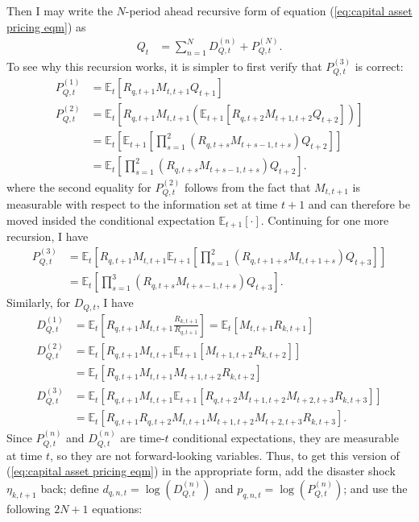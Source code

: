 \documentclass[12 pt, oneside]{article}
\theoremstyle{definition}
\theoremstyle{definition}
\theoremstyle{definition}
\newcommand{\E}{\mathbb{E}}
\begin{document}
Then I may write the $N$-period ahead recursive form of equation (\ref{eq:capital asset pricing eqm}) as
\begin{align*}
  Q_t & = \sum_{n = 1}^ND_{Q, t}^{(n)} + P_{Q, t}^{(N)}.
\end{align*}
To see why this recursion works, it is simpler to first verify that $P_{Q, t}^{(3)}$ is correct:
\begin{align*}
  P_{Q, t}^{(1)} & = \E_t\left[R_{q, t + 1}M_{t, t + 1} Q_{t + 1}\right]\\
  P_{Q, t}^{(2)} & = \E_t\left[R_{q, t + 1}M_{t, t + 1} (\E_{t + 1}[R_{q, t + 2}M_{t + 1, t + 2} Q_{t + 2}])\right]\\
                 & = \E_t\left[\E_{t + 1}\left[\prod_{s = 1}^2(R_{q, t + s}M_{t + s - 1, t + s}) Q_{t + 2}\right]\right]\\
                 & = \E_t\left[\prod_{s = 1}^2(R_{q, t + s}M_{t + s - 1, t + s}) Q_{t + 2}\right].
\end{align*}
where the second equality for $P_{Q, t}^{(2)}$ follows from the fact that $M_{t, t + 1}$ is measurable with respect to the information set at time $t + 1$ and can
therefore be moved insided the conditional expectation $\E_{t + 1}[\cdot]$. Continuing for one more recursion, I have
\begin{align*}
  P_{Q, t}^{(3)} & = \E_t\left[R_{q, t + 1}M_{t, t + 1}\E_{t + 1}\left[\prod_{s = 1}^2(R_{q, t + 1 + s}M_{t, t + 1 + s}) Q_{t + 3}\right]\right]\\
                 & = \E_t\left[\prod_{s = 1}^3(R_{q, t + s}M_{t + s - 1, t + s}) Q_{t + 3}\right].
\end{align*}
Similarly, for $D_{Q, t}$, I have
\begin{align*}
  D_{Q, t}^{(1)} & = \E_t\left[R_{q, t + 1}M_{t, t + 1}\frac{R_{k, t + 1}}{R_{q, t + 1}}\right] = \E_t[M_{t, t + 1} R_{k, t + 1}]\\
  D_{Q, t}^{(2)} & = \E_t[R_{q, t + 1}M_{t, t + 1}\E_{t + 1}[M_{t + 1, t + 2}R_{k, t + 2}]]\\
                 & = \E_t[R_{q, t + 1}M_{t, t + 1}M_{t + 1, t + 2}R_{k, t + 2}]\\
  D_{Q, t}^{(3)} & = \E_t[R_{q, t + 1}M_{t, t + 1}\E_{t + 1}[R_{q, t + 2}M_{t + 1, t + 2}M_{t + 2, t + 3}R_{k, t + 3}]]\\
                 & = \E_t[R_{q, t + 1}R_{q, t + 2}M_{t, t + 1}M_{t + 1, t + 2}M_{t + 2, t + 3}R_{k, t + 3}].
\end{align*}
Since $P_{Q, t}^{(n)}$ and $D_{Q, t}^{(n)}$ are time-$t$ conditional expectations, they are measurable at time $t$, so they are not forward-looking variables. Thus, to get this version of (\ref{eq:capital asset pricing eqm}) in the appropriate form, add the disaster shock $\eta_{k, t + 1}$ back; define $d_{q, n, t} = \log(D_{Q, t}^{(n)})$ and $p_{q, n, t} = \log(P_{Q, t}^{(n)})$; and use the following $2N + 1$ equations:
\end{document}
